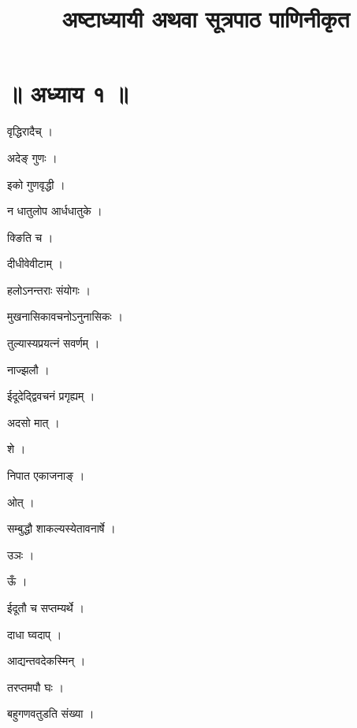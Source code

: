 \documentclass[10pt, openany]{book}
\title{अष्टाध्यायी अथवा सूत्रपाठ पाणिनीकृत}
\date{}
\begin{document}
\maketitle

\section*{॥ अध्याय १ ॥}

\noindent वृद्धिरादैच् ।

\noindent अदेङ् गुणः ।

\noindent इको गुणवृद्धी ।

\noindent न धातुलोप आर्धधातुके ।

\noindent क्ङिति च ।

\noindent दीधीवेवीटाम् ।

\noindent हलोऽनन्तराः संयोगः ।

\noindent मुखनासिकावचनोऽनुनासिकः ।

\noindent तुल्यास्यप्रयत्नं सवर्णम् ।

\noindent नाज्झलौ ।

\noindent ईदूदेद्द्विवचनं प्रगृह्यम् ।

\noindent अदसो मात् ।

\noindent शे ।

\noindent निपात एकाजनाङ् ।

\noindent ओत् ।

\noindent सम्बुद्धौ शाकल्यस्येतावनार्षे ।

\noindent उञः ।

\noindent ऊँ ।

\noindent ईदूतौ च सप्तम्यर्थे ।

\noindent दाधा घ्वदाप् ।

\noindent आद्यन्तवदेकस्मिन् ।

\noindent तरप्तमपौ घः ।

\noindent बहुगणवतुडति संख्या ।
\end{document}
